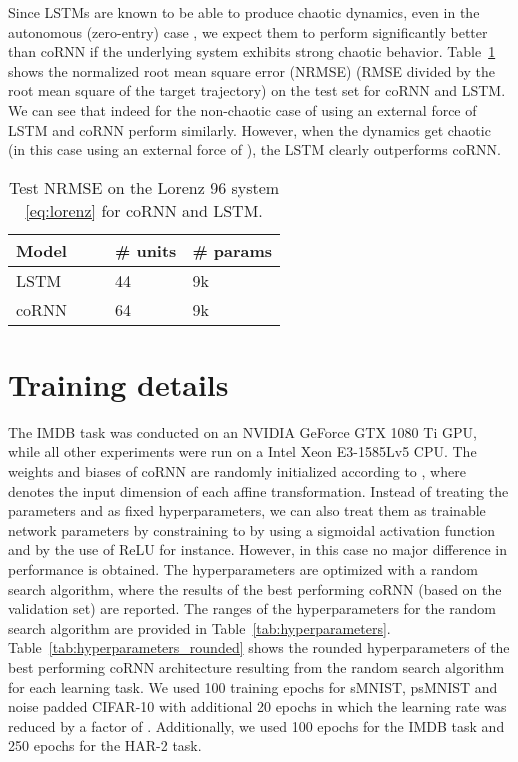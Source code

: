 \documentclass{article} \usepackage{iclr2021_conference,times}
\newcommand{\Tref}[1]{Table~\ref{#1}}
\begin{document}
Since LSTMs are known to be able to produce chaotic dynamics, even in the autonomous (zero-entry) case \citep{chaotic_lstm}, we expect them to perform significantly better than coRNN if the underlying system exhibits strong chaotic behavior. 
\Tref{tab:lorenz} shows the normalized root mean square error (NRMSE) (RMSE divided by the root mean square of the target trajectory) on the test set for coRNN and LSTM. We can see that indeed for the non-chaotic case of using an external force of  LSTM and coRNN perform similarly. However, when the dynamics get chaotic (in this case using an external force of ), the LSTM clearly outperforms coRNN. 
\begin{table}[h!]
  \caption{Test NRMSE on the Lorenz 96 system \eqref{eq:lorenz} for coRNN and LSTM.}
  \label{tab:lorenz}
  \centering
  \begin{tabular}{lllll}
    \toprule
    \cmidrule(r){1-5}
    Model &  &  & \# units & \# params \\
        \midrule
    LSTM & &  & 44 & 9k\\
    coRNN &  &  & 64 & 9k\\
    \bottomrule
  \end{tabular}
\end{table}



\section{Training details}
\label{app:training_details}
The IMDB task was conducted on an NVIDIA GeForce GTX 1080 Ti GPU, while all other experiments were run on a Intel Xeon E3-1585Lv5 CPU.
The weights and biases of coRNN are randomly initialized according to , where  denotes the input dimension of each affine transformation. Instead of treating the parameters  and  as fixed hyperparameters, we can also treat them as trainable network parameters by constraining  to  by using a sigmoidal activation function and  by the use of ReLU for instance. However, in this case no major difference in performance is obtained.
The hyperparameters are optimized with a random search algorithm, where the results of the best performing coRNN (based on the validation set) are reported. The ranges of the hyperparameters for the random search algorithm are provided in \Tref{tab:hyperparameters}. \Tref{tab:hyperparameters_rounded} shows the rounded hyperparameters of the best performing coRNN architecture resulting from the random search algorithm for each learning task. We used 100 training epochs for sMNIST, psMNIST and noise padded CIFAR-10 with additional 20 epochs in which the learning rate was reduced by a factor of . Additionally, we used 100 epochs for the IMDB task and 250 epochs for the HAR-2 task.
\end{document}
